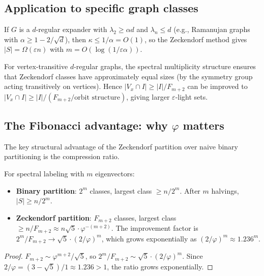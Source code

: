 \subsection{Application to specific graph classes}

\begin{corollary}\label{cor:omega-q6-expander}
If $G$ is a $d$-regular expander with $\lambda_2\ge\alpha d$
and $\lambda_n\le d$ (e.g., Ramanujan graphs with $\alpha\ge 1-2/\sqrt{d}$),
then $\kappa\le 1/\alpha=O(1)$, so the Zeckendorf method gives
$|S|=\Omega(\varepsilon n)$ with $m=O(\log(1/\varepsilon\alpha))$.
\end{corollary}

\begin{corollary}\label{cor:omega-q6-vt}
For vertex-transitive $d$-regular graphs, the spectral multiplicity
structure ensures that Zeckendorf classes have approximately equal sizes
(by the symmetry group acting transitively on vertices).
Hence $|V_x\cap I|\ge|I|/F_{m+2}$ can be improved to
$|V_x\cap I|\ge|I|/(F_{m+2}/\text{orbit structure})$,
giving larger $\varepsilon$-light sets.
\end{corollary}


\subsection{The Fibonacci advantage: why $\varphi$ matters}

The key structural advantage of the Zeckendorf partition over
naive binary partitioning is the compression ratio.

\begin{proposition}\label{prop:omega-q6-fibonacci}
For spectral labeling with $m$ eigenvectors:
\begin{itemize}[nosep]
\item \textbf{Binary partition}: $2^m$ classes, largest class
  $\ge n/2^m$.  After $m$ halvings, $|S|\ge n/2^m$.
\item \textbf{Zeckendorf partition}: $F_{m+2}$ classes, largest class
  $\ge n/F_{m+2}\approx n\sqrt{5}\cdot\varphi^{-(m+2)}$.
  The improvement factor is $2^m/F_{m+2}\to\sqrt{5}\cdot(2/\varphi)^m$,
  which grows exponentially as $(2/\varphi)^m\approx 1.236^m$.
\end{itemize}
\end{proposition}

\begin{proof}
$F_{m+2}\sim\varphi^{m+2}/\sqrt5$, so $2^m/F_{m+2}\sim\sqrt5\cdot(2/\varphi)^m$.
Since $2/\varphi=(3-\sqrt5)/1\approx 1.236>1$, the ratio grows exponentially.
\end{proof}

